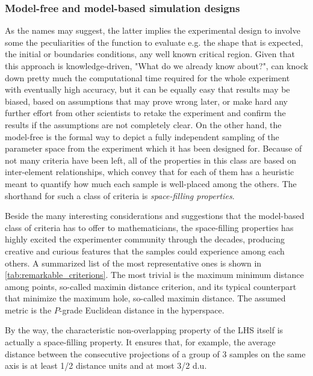 \documentclass[12pt]{extarticle}
\newcommand{\midcaption}[1]{
    \captionsetup{justification=centering}
    \caption{#1}
}
\begin{document}
\begin{figure}[h]
	\midcaption{}
    \label{fig:latin_square}
\end{figure}

\subsubsection{Model-free and model-based simulation designs}
\label{subsubsec:model_free_model_based}
As the names may suggest, the latter implies the experimental design to involve some the peculiarities of the function to evaluate e.g. the shape that is expected, the initial or boundaries conditions, any well known critical region. Given that this approach is knowledge-driven, "What do we already know about?", can knock down pretty much the computational time required for the whole experiment with eventually high accuracy, but it can be equally easy that results may be biased, based on assumptions that may prove wrong later, or make hard any further effort from other scientists to retake the experiment and confirm the results if the assumptions are not completely clear.
On the other hand, the model-free is the formal way to depict a fully independent sampling of the parameter space from the experiment which it has been designed for. Because of not many criteria have been left, all of the properties in this class are based on inter-element relationships, which convey that for each of them has a heuristic meant to quantify how much each sample is well-placed among the others. The shorthand for such a class of criteria is \textit{space-filling properties}.

Beside the many interesting considerations and suggestions that the model-based class of criteria has to offer to mathematicians, the space-filling properties has highly excited the experimenter community through the decades, producing creative and curious features that the samples could experience among each others. A summarized list of the most representative ones is shown in \cref{tab:remarkable_criterions}. The most trivial is the maximum minimum distance among points, so-called maximin distance criterion, and its typical counterpart that minimize the maximum hole, so-called maximin distance. The assumed metric is the $P$-grade Euclidean distance in the hyperspace.

By the way, the characteristic non-overlapping property of the LHS itself is actually a space-filling property. It ensures that, for example, the average distance between the consecutive projections of a group of 3 samples on the same axis is at least 1/2 distance units and at most 3/2 d.u.
\end{document}
